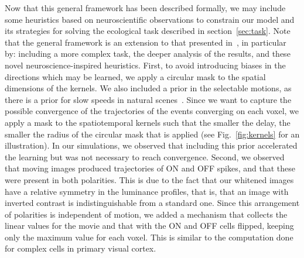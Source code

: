 \documentclass[default]{sn-jnl}%
\theoremstyle{thmstyleone}%
\theoremstyle{thmstyletwo}%
\theoremstyle{thmstylethree}%
\newcommand{\seeFig}[1]{see Fig.~\ref{fig:#1}}%
\begin{document}
Now that this general framework has been described formally, we may include some heuristics based on neuroscientific observations to constrain our model and its strategies for solving the ecological task described in section~\ref{sec:task}. Note that the general framework is an extension to that presented in~\cite{grimaldi_learning_2022}, in particular by: including a more complex task, the deeper analysis of the results, and these novel neuroscience-inspired heuristics. First, to avoid introducing biases in the directions which may be learned, we apply a circular mask to the spatial dimensions of the kernels. We also included a prior in the selectable motions, as there is a prior for slow speeds in natural scenes~\citep{vacher_bayesian_2018}. Since we want to capture the possible convergence of the trajectories of the events converging on each voxel, we apply a mask to the spatiotemporal kernels such that the smaller the delay, the smaller the radius of the circular mask that is applied (\seeFig{kernels} for an illustration). In our simulations, we observed that including this prior accelerated the learning but was not necessary to reach convergence. %
Second, we observed that moving images produced trajectories of ON and OFF spikes, and that these were present in both polarities. This is due to the fact that our whitened images have a relative symmetry in the luminance profiles, that is, that an image with inverted contrast is indistinguishable from a standard one. Since this arrangement of polarities is independent of motion, we added a mechanism that collects the linear values for the movie and that with the ON and OFF cells flipped, keeping only the maximum value for each voxel. This is similar to the computation done for complex cells in primary visual cortex.
\end{document}
